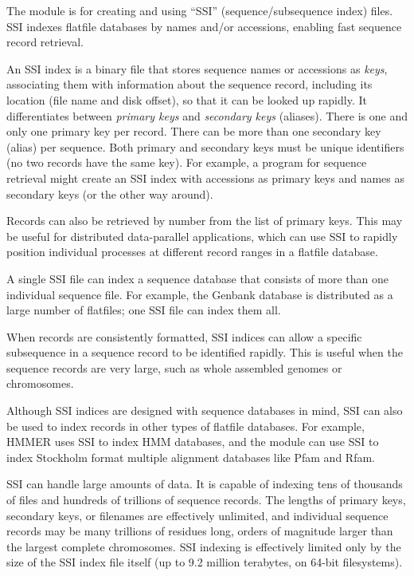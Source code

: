 The  module is for creating and using ``SSI''
(sequence/subsequence index) files. SSI indexes flatfile databases by
names and/or accessions, enabling fast sequence record retrieval. 

An SSI index is a binary file that stores sequence names or accessions
as \emph{keys}, associating them with information about the sequence
record, including its location (file name and disk offset), so that it
can be looked up rapidly. It differentiates between \emph{primary
keys} and \emph{secondary keys} (aliases).  There is one and only one
primary key per record. There can be more than one secondary key
(alias) per sequence. Both primary and secondary keys must be unique
identifiers (no two records have the same key). For example, a program
for sequence retrieval might create an SSI index with accessions as
primary keys and names as secondary keys (or the other way around).

Records can also be retrieved by number from the list of primary keys.
This may be useful for distributed data-parallel applications, which
can use SSI to rapidly position individual processes at different
record ranges in a flatfile database.

A single SSI file can index a sequence database that consists of more
than one individual sequence file. For example, the Genbank database
is distributed as a large number of flatfiles; one SSI file can index
them all.

When records are consistently formatted, SSI indices can allow a
specific subsequence in a sequence record to be identified
rapidly. This is useful when the sequence records are very large, such
as whole assembled genomes or chromosomes.

Although SSI indices are designed with sequence databases in mind, SSI
can also be used to index records in other types of flatfile
databases. For example, HMMER uses SSI to index HMM databases, and the
 module can use SSI to index Stockholm format multiple
alignment databases like Pfam and Rfam.

SSI can handle large amounts of data. It is capable of indexing tens
of thousands of files and hundreds of trillions of sequence records.
The lengths of primary keys, secondary keys, or filenames are
effectively unlimited, and individual sequence records may be many
trillions of residues long, orders of magnitude larger than the
largest complete chromosomes. SSI indexing is effectively limited only
by the size of the SSI index file itself (up to 9.2 million terabytes,
on 64-bit filesystems).

